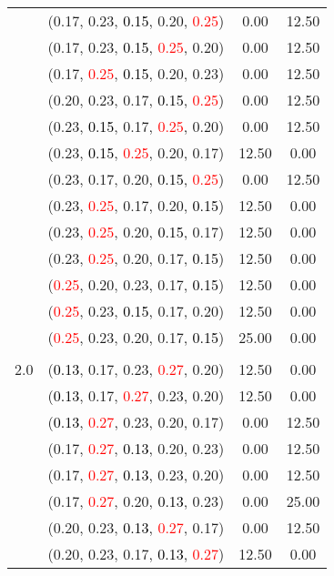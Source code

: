 \documentclass[10pt,a4paper]{report}
\begin{document}
\begin{center}
\begin{longtable}{clcc}
			&(0.17, 0.23, \textcolor{black}{0.15}, 0.20, \textcolor{red}{0.25})&0.00&12.50\\
			&(0.17, 0.23, \textcolor{black}{0.15}, \textcolor{red}{0.25}, 0.20)&0.00&12.50\\
			&(0.17, \textcolor{red}{0.25}, \textcolor{black}{0.15}, 0.20, 0.23)&0.00&12.50\\
			&(0.20, 0.23, 0.17, \textcolor{black}{0.15}, \textcolor{red}{0.25})&0.00&12.50\\
			&(0.23, \textcolor{black}{0.15}, 0.17, \textcolor{red}{0.25}, 0.20)&0.00&12.50\\
			&(0.23, \textcolor{black}{0.15}, \textcolor{red}{0.25}, 0.20, 0.17)&12.50&0.00\\
			&(0.23, 0.17, 0.20, \textcolor{black}{0.15}, \textcolor{red}{0.25})&0.00&12.50\\
			&(0.23, \textcolor{red}{0.25}, 0.17, 0.20, \textcolor{black}{0.15})&12.50&0.00\\
			&(0.23, \textcolor{red}{0.25}, 0.20, \textcolor{black}{0.15}, 0.17)&12.50&0.00\\
			&(0.23, \textcolor{red}{0.25}, 0.20, 0.17, \textcolor{black}{0.15})&12.50&0.00\\
			&(\textcolor{red}{0.25}, 0.20, 0.23, 0.17, \textcolor{black}{0.15})&12.50&0.00\\
			&(\textcolor{red}{0.25}, 0.23, \textcolor{black}{0.15}, 0.17, 0.20)&12.50&0.00\\
			&(\textcolor{red}{0.25}, 0.23, 0.20, 0.17, \textcolor{black}{0.15})&25.00&0.00\\
		&&&\\
		2.0			&(\textcolor{black}{0.13}, 0.17, 0.23, \textcolor{red}{0.27}, 0.20)&12.50&0.00\\
			&(\textcolor{black}{0.13}, 0.17, \textcolor{red}{0.27}, 0.23, 0.20)&12.50&0.00\\
			&(\textcolor{black}{0.13}, \textcolor{red}{0.27}, 0.23, 0.20, 0.17)&0.00&12.50\\
			&(0.17, \textcolor{red}{0.27}, \textcolor{black}{0.13}, 0.20, 0.23)&0.00&12.50\\
			&(0.17, \textcolor{red}{0.27}, \textcolor{black}{0.13}, 0.23, 0.20)&0.00&12.50\\
			&(0.17, \textcolor{red}{0.27}, 0.20, \textcolor{black}{0.13}, 0.23)&0.00&25.00\\
			&(0.20, 0.23, \textcolor{black}{0.13}, \textcolor{red}{0.27}, 0.17)&0.00&12.50\\
			&(0.20, 0.23, 0.17, \textcolor{black}{0.13}, \textcolor{red}{0.27})&12.50&0.00\\

\end{longtable}
\end{center}
\end{document}
